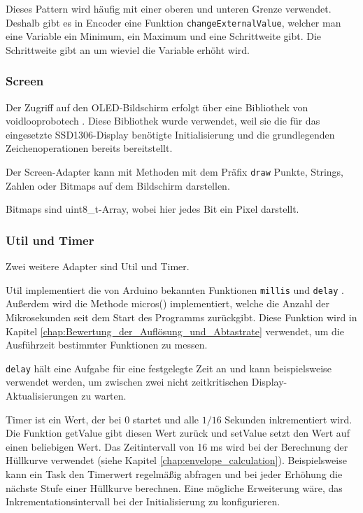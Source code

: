 Dieses Pattern wird häufig mit einer oberen und unteren Grenze verwendet.
Deshalb gibt es in Encoder eine Funktion \lstinline|changeExternalValue|,
welcher man eine Variable ein Minimum, ein Maximum und eine 
Schrittweite gibt. Die Schrittweite gibt an um wieviel die 
Variable erhöht wird.


\subsubsection{Screen}

Der Zugriff auf den OLED-Bildschirm erfolgt über eine Bibliothek
von voidlooprobotech \cite{voidloop2026ssd1306}. Diese
Bibliothek wurde verwendet, weil sie die für das eingesetzte SSD1306-Display
benötigte Initialisierung und die grundlegenden Zeichenoperationen bereits
bereitstellt.

Der Screen-Adapter kann mit Methoden mit dem Präfix \lstinline|draw| 
Punkte, Strings, Zahlen oder Bitmaps auf dem Bildschirm darstellen.

Bitmaps sind uint8\_t-Array, wobei hier jedes Bit ein Pixel darstellt.


\subsubsection{Util und Timer}
Zwei weitere Adapter sind Util und Timer.

Util implementiert die von Arduino bekannten Funktionen \lstinline|millis|
und \lstinline|delay| \cite{arduinoMillis,arduinoDelay}. Außerdem wird die 
Methode micros() implementiert, welche die Anzahl der Mikrosekunden seit dem 
Start des Programms zurückgibt. Diese Funktion wird in Kapitel 
\ref{chap:Bewertung_der_Auflösung_und_Abtastrate} verwendet, um die Ausführzeit
bestimmter Funktionen zu messen. 

\lstinline|delay| hält eine Aufgabe für eine festgelegte Zeit an und
kann beispielsweise verwendet werden, um zwischen zwei nicht zeitkritischen
Display-Aktualisierungen zu warten.

Timer ist ein Wert, der bei 0 startet und alle $1/16$ Sekunden inkrementiert wird.
Die Funktion getValue gibt diesen Wert zurück und setValue setzt den 
Wert auf einen beliebigen Wert.
Das Zeitintervall von 16 ms wird bei der Berechnung der Hüllkurve verwendet
(siehe Kapitel \ref{chap:envelope_calculation}). Beispielsweise kann ein
Task den Timerwert regelmäßig abfragen und bei jeder Erhöhung die nächste
Stufe einer Hüllkurve berechnen. Eine mögliche Erweiterung wäre, das
Inkrementationsintervall bei der Initialisierung zu konfigurieren.

